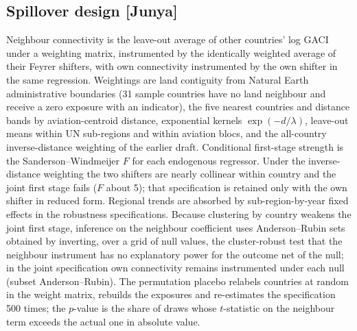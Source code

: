 \documentclass[12pt]{article}
\begin{document}
\subsection*{Spillover design [Junya]}
Neighbour connectivity is the leave-out average of other countries' log
GACI under a weighting matrix, instrumented by the identically weighted
average of their Feyrer shifters, with own connectivity instrumented by the
own shifter in the same regression. Weightings are land contiguity from
Natural Earth administrative boundaries (31 sample countries have no land
neighbour and receive a zero exposure with an indicator), the five nearest
countries and distance bands by aviation-centroid distance, exponential
kernels $\exp(-d/\lambda)$, leave-out means within UN sub-regions and
within aviation blocs, and the all-country inverse-distance weighting of
the earlier draft. Conditional first-stage strength is the
Sanderson--Windmeijer $F$ for each endogenous regressor. Under the
inverse-distance weighting the two shifters are nearly collinear within
country and the joint first stage fails ($F$ about 5); that specification
is retained only with the own shifter in reduced form. Regional trends are
absorbed by sub-region-by-year fixed effects in the robustness
specifications. Because clustering by country weakens the joint first
stage, inference on the neighbour coefficient uses Anderson--Rubin sets
obtained by inverting, over a grid of null values, the cluster-robust test
that the neighbour instrument has no explanatory power for the outcome net
of the null; in the joint specification own connectivity remains
instrumented under each null (subset Anderson--Rubin). The permutation placebo relabels countries at random in
the weight matrix, rebuilds the exposures and re-estimates the
specification 500 times; the $p$-value is the share of draws whose
$t$-statistic on the neighbour term exceeds the actual one in absolute
value.
\end{document}
